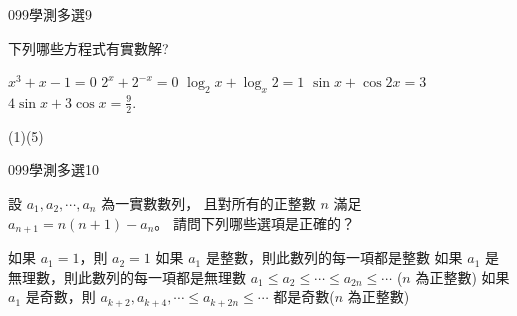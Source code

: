 \begin{QUESTIONS}
    \begin{QUESTION}
        \begin{ExamInfo}{099}{學測}{多選}{9}
        \end{ExamInfo}
        \begin{ExamAnsRateInfo}{24}{50}{14}{8}
        \end{ExamAnsRateInfo}
        \begin{QBODY}
			下列哪些方程式有實數解?
			\begin{QOPS} 
				\QOP $x^3 +x -1=0$ 
				\QOP $2^x +2^{-x} =0$ 
				\QOP $\log_2 x+ \log_x 2=1$ 
				\QOP $\sin{x}+ \cos{2x}=3$
				\QOP $4\sin{x}+3\cos{x}=\frac{9}{2}$.
			\end{QOPS}
        \end{QBODY}
        \begin{QFROMS}
        \end{QFROMS}
        \begin{QTAGS}\end{QTAGS}
        \begin{QANS}
            (1)(5)
        \end{QANS}
        \begin{QSOLLIST}
        \end{QSOLLIST}
        \begin{QEMPTYSPACE}
        \end{QEMPTYSPACE}
    \end{QUESTION}
    \begin{QUESTION}
        \begin{ExamInfo}{099}{學測}{多選}{10}
        \end{ExamInfo}
        \begin{ExamAnsRateInfo}{34}{53}{33}{16}
        \end{ExamAnsRateInfo}
        \begin{QBODY}
			設 $a_{1},a_{2},\cdots,a_{n}$ 為一實數數列，
			且對所有的正整數 $n$ 滿足 $a_{n+1} = n(n+1) - a_{n}$。
			請問下列哪些選項是正確的？
			\begin{QOPS} 
				\QOP 如果 $a_{1}=1$，則 $a_{2}=1$
				\QOP 如果 $a_{1}$ 是整數，則此數列的每一項都是整數
				\QOP 如果 $a_{1}$ 是無理數，則此數列的每一項都是無理數
				\QOP $a_{1} \leq a_{2} \leq  \cdots \leq a_{2n} \leq \cdots $ ($n$ 為正整數)
				\QOP 如果 $a_{1}$ 是奇數，則 
			$a_{k+2}, a_{k+4} ,  \cdots \leq a_{k+2n} \leq \cdots $ 都是奇數($n$ 為正整數)
			\end{QOPS}
        \end{QBODY}
        \begin{QFROMS}

\end{QFROMS}
\end{QUESTION}
\end{QUESTIONS}
